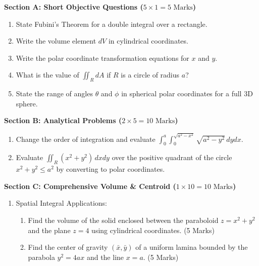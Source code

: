 \begin{chaptertest}
\noindent\textbf{Section A: Short Objective Questions ($5 \times 1 = 5\text{ Marks}$)}
\begin{enumerate}[leftmargin=1.5em]
    \item State Fubini's Theorem for a double integral over a rectangle.
    \item Write the volume element $dV$ in cylindrical coordinates.
    \item Write the polar coordinate transformation equations for $x$ and $y$.
    \item What is the value of $\iint_R dA$ if $R$ is a circle of radius $a$?
    \item State the range of angles $\theta$ and $\phi$ in spherical polar coordinates for a full 3D sphere.
\end{enumerate}

\medskip
\noindent\textbf{Section B: Analytical Problems ($2 \times 5 = 10\text{ Marks}$)}
\begin{enumerate}[leftmargin=1.5em, start=6]
    \item Change the order of integration and evaluate $\int_0^a \int_0^{\sqrt{a^2-x^2}} \sqrt{a^2-y^2}\,dy dx$.
    \item Evaluate $\iint_R (x^2+y^2)\,dx dy$ over the positive quadrant of the circle $x^2+y^2 \le a^2$ by converting to polar coordinates.
\end{enumerate}

\medskip
\noindent\textbf{Section C: Comprehensive Volume \& Centroid ($1 \times 10 = 10\text{ Marks}$)}
\begin{enumerate}[leftmargin=1.5em, start=8]
    \item Spatial Integral Applications:
    \begin{enumerate}[label=(\alph*)]
        \item Find the volume of the solid enclosed between the paraboloid $z = x^2+y^2$ and the plane $z = 4$ using cylindrical coordinates. (5 Marks)
        \item Find the center of gravity $(\bar{x}, \bar{y})$ of a uniform lamina bounded by the parabola $y^2 = 4ax$ and the line $x = a$. (5 Marks)
    \end{enumerate}
\end{enumerate}
\end{chaptertest}

